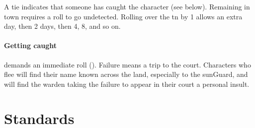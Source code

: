 \begin{multicols}{2}
A tie indicates that someone has caught the character (see below).
Remaining in town requires a  roll to go undetected.
Rolling over the \gls{tn} by 1 allows an extra day, then 2 days, then 4, 8, and so on.

\paragraph{Getting caught}
demands an immediate  roll (\tn[10]).
Failure means a trip to the \gls{court}.
Characters who flee will find their name known across the land, especially to the \gls{sunGuard}, and will find the \gls{warden} taking the failure to appear in their \gls{court} a personal insult.


\end{multicols}

\section{Standards}

